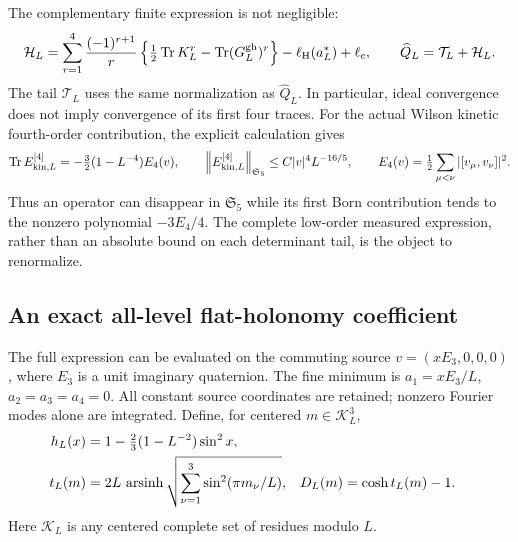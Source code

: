 \documentclass[11pt,oneside,openany]{book}
\theoremstyle{definition}
\theoremstyle{remark}
\newcommand{\Tr}{\operatorname{Tr}}
\newcommand{\norm}[1]{\left\lVert#1\right\rVert}
\begin{document}
The complementary finite expression is not negligible:
\begin{equation}
 \mathcal H_L=
 \sum_{r=1}^4\frac{(-1)^{r+1}}r
 \left\{\tfrac12\Tr K_L^r-\Tr(G_L^{\rm gh})^r\right\}
          -\ell_{\rm H}(a_L^*)+\ell_c,
 \qquad
 \widehat Q_L=\mathcal T_L+\mathcal H_L.
 \label{eq:cofinal-Born-head}
\end{equation}
The tail $\mathcal T_L$ uses the same normalization as
$\widehat Q_L$. In particular, ideal convergence does not imply convergence of its first four traces.
For the actual Wilson kinetic fourth-order contribution, the explicit
calculation gives
\[
 \Tr E_{{\rm kin},L}^{[4]}
   =-\tfrac32(1-L^{-4})E_4(v),\qquad
 \norm{E_{{\rm kin},L}^{[4]}}_{\mathfrak S_5}
                   \le C|v|^4L^{-16/5},
 \qquad
 E_4(v)=\tfrac12\sum_{\mu<\nu}|[v_\mu,v_\nu]|^2.
\]
Thus an operator can disappear in $\mathfrak S_5$ while its first
Born contribution tends to the nonzero polynomial $-3E_4/4$.
The complete low-order measured expression, rather than an absolute
bound on each determinant tail, is the object to renormalize.

\subsection{An exact all-level flat-holonomy coefficient}
\label{sec:cofinal-flat-response}
The full expression can be evaluated on the commuting source
$v=(xE_3,0,0,0)$, where $E_3$ is a unit imaginary quaternion. The
fine minimum is $a_1=xE_3/L$, $a_2=a_3=a_4=0$. All constant source
coordinates are retained; nonzero Fourier modes alone are integrated.
Define, for centered $m\in\mathcal K_L^3$,
\begin{align}
 h_L(x)&=1-\tfrac23(1-L^{-2})\sin^2x,\notag\\
 t_L(m)&=2L\,\operatorname{arsinh}
       \sqrt{\sum_{\nu=1}^3\sin^2(\pi m_\nu/L)},&
 D_L(m)&=\cosh t_L(m)-1.
 \label{eq:flat-cofinal-symbols}
\end{align}
Here $\mathcal K_L$ is any centered complete set of residues modulo $L$.
\end{document}
